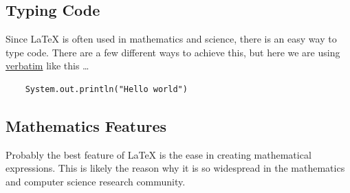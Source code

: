 \subsection{Typing Code}
{Since LaTeX is often used in mathematics and science, there is an easy way to type code. There are a few different ways to achieve this, but here we are using \underline{verbatim} like this \ldots}
\begin{verbatim}
    System.out.println("Hello world")
\end{verbatim}
\subsection{Mathematics Features}
{Probably the best feature of LaTeX is the ease in creating mathematical expressions. This is likely the reason why it is so widespread in the mathematics and computer science research community.}

